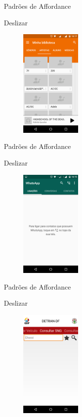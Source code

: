 \begin{frame}{Padrões de Affordance}
\begin{block}{Deslizar}
    \begin{figure}
    \includegraphics[width=3cm]{figuras/deslize/deslize3}
    \end{figure}
\end{block}
\end{frame}

\begin{frame}{Padrões de Affordance}
\begin{block}{Deslizar}
    \begin{figure}
    \includegraphics[width=3cm]{figuras/deslize/deslize1}
    \end{figure}
\end{block}
\end{frame}

\begin{frame}{Padrões de Affordance}
\begin{block}{Deslizar}
    \begin{figure}
    \includegraphics[width=3cm]{figuras/deslize/deslize6}
    \end{figure}
\end{block}
\end{frame}

